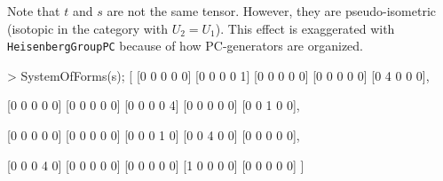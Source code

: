 \begin{example}[CraftingPGroups]
Note that $t$ and $s$ are not the same tensor. However, they are
pseudo-isometric (isotopic in the category with $U_2=U_1$). This effect is
exaggerated with \texttt{HeisenbergGroupPC} because of how PC-generators are
organized.
\begin{code}
> SystemOfForms(s);
[
    [0 0 0 0 0]
    [0 0 0 0 1]
    [0 0 0 0 0]
    [0 0 0 0 0]
    [0 4 0 0 0],

    [0 0 0 0 0]
    [0 0 0 0 0]
    [0 0 0 0 4]
    [0 0 0 0 0]
    [0 0 1 0 0],

    [0 0 0 0 0]
    [0 0 0 0 0]
    [0 0 0 1 0]
    [0 0 4 0 0]
    [0 0 0 0 0],

    [0 0 0 4 0]
    [0 0 0 0 0]
    [0 0 0 0 0]
    [1 0 0 0 0]
    [0 0 0 0 0]
]
\end{code}
\end{example}

